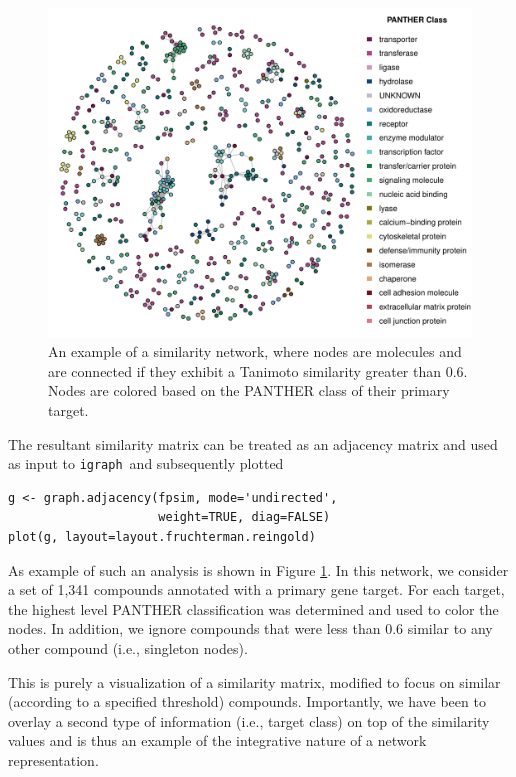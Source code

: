 \documentclass[]{book}
\newcommand{\igraph}{\texttt{igraph}\ }
\begin{document}
\begin{figure}[h]
  \centering
  \includegraphics[width=\linewidth]{img/sim-network-connected}
  \caption{An example of a similarity network, where nodes are
    molecules and are connected if they exhibit a Tanimoto similarity
    greater than 0.6. Nodes are colored based on the PANTHER
    \cite{Mi:2005qq} class of their primary target.}
  \label{fig:simnet}
\end{figure}

The resultant similarity matrix can be treated as an adjacency matrix
and used as input to \igraph and subsequently plotted
\begin{lstlisting}
g <- graph.adjacency(fpsim, mode='undirected', 
                     weight=TRUE, diag=FALSE)
plot(g, layout=layout.fruchterman.reingold)
\end{lstlisting}
As example of such an analysis is shown in Figure \ref{fig:simnet}. In
this network, we consider a set of 1,341 compounds annotated with a
primary gene target. For each target, the highest level PANTHER
\cite{Mi:2005qq} classification was determined and used to color the
nodes. In addition, we ignore compounds that were less than 0.6
similar to any other compound (i.e., singleton nodes).

This is purely a visualization of a similarity matrix,
modified to focus on similar (according to a specified threshold)
compounds. Importantly, we have been to overlay a second type of
information (i.e., target class) on top of the similarity values and
is thus an example of the integrative nature of a network
representation.
\end{document}
